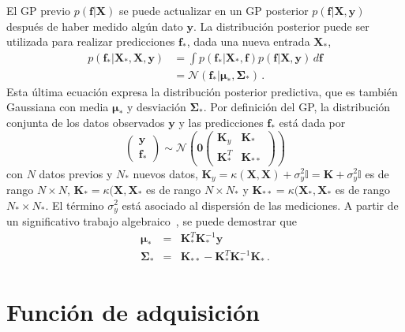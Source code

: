 El GP previo $p(\mathbf{f}|\mathbf{X})$ se puede actualizar en un GP
posterior $p(\mathbf{f}|\mathbf{X},\mathbf{y})$ después de haber medido
algún dato $\mathbf{y}$. La distribución posterior puede ser utilizada 
para realizar predicciones $\mathbf{f}_*$, dada una nueva entrada 
$\mathbf{X}_*$,
\begin{eqnarray}
p(\mathbf{f}_*|\mathbf{X}_*,\mathbf{X},\mathbf{y})
&=\int p(\mathbf{f}_*|\mathbf{X}_*,\mathbf{f}) p(\mathbf{f}|\mathbf{X},
\mathbf{y})\,d\mathbf{f} \\
&=\mathcal{N}(\mathbf{f}_*|\boldsymbol\mu_*,\boldsymbol\Sigma_*)\,.
\end{eqnarray}
Esta última ecuación expresa la distribución posterior predictiva, que 
es también Gaussiana con media $\boldsymbol\mu_*$ y desviación 
$\boldsymbol\Sigma_*$. Por definición del GP, la distribución conjunta
de los datos observados $\mathbf{y}$ y las predicciones $\mathbf{f}_*$ 
está dada por
\begin{equation}
\left(\begin{array}{c}
\mathbf{y}\\
\mathbf{f}_*
\end{array} 
\right)\sim\mathcal{N}\left(\mathbf{0}
\left(
\begin{array}{cc}
\mathbf{K}_y & \mathbf{K}_* \\
\mathbf{K}_*^T & \mathbf{K}_{**}
\end{array}
\right)
\right)
\end{equation}
con $N$ datos previos y $N_*$ nuevos datos, 
$\mathbf{K}_y=\kappa(\mathbf{X},\mathbf{X})+\sigma_y^2\mathbb{I} = 
\mathbf{K}+\sigma_y^2\mathbb{I}$ es de rango $N\times N$, 
$\mathbf{K}_*=\kappa(\mathbf{X},\mathbf{X}_*$ es de rango $N\times N_*$
y $\mathbf{K}_{**}=\kappa(\mathbf{X}_*,\mathbf{X}_*$ es de rango 
$N_*\times N_*$. El término $\sigma_y^2$ está asociado al dispersión de 
las mediciones.
A partir de un significativo trabajo algebraico~\cite{Murphy:12,
Rasmussen:06,deFreitas:13}, se puede demostrar que
\begin{eqnarray}
\boldsymbol\mu_*&=&\mathbf{K}_*^T\mathbf{K}_*^{-1}\mathbf{y}\, \\
\boldsymbol\Sigma_*&=&\mathbf{K}_{**}-\mathbf{K}_*^T\mathbf{K}_*^{-1}
\mathbf{K}_*\,.
\end{eqnarray}

\section*{Función de adquisición}

